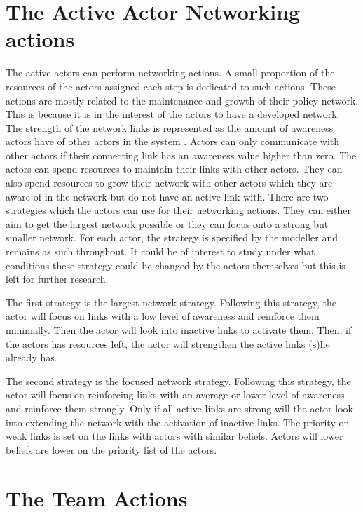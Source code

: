 %
\section{The Active Actor Networking actions}
\label{sec:actorNetworkingActions}

The active actors can perform networking actions. A small proportion of the resources of the actors assigned each step is dedicated to such actions. These actions are mostly related to the maintenance and growth of their policy network. This is because it is in the interest of the actors to have a developed network. The strength of the network links is represented as the amount of awareness actors have of other actors in the system \citep{heikkila2013building}. Actors can only communicate with other actors if their connecting link has an awareness value higher than zero. The actors can spend resources to maintain their links with other actors. They can also spend resources to grow their network with other actors which they are aware of in the network but do not have an active link with. There are two strategies which the actors can use for their networking actions. They can either aim to get the largest network possible or they can focus onto a strong but smaller network. For each actor, the strategy is specified by the modeller and remains as such throughout. It could be of interest to study under what conditions these strategy could be changed by the actors themselves but this is left for further research.

The first strategy is the largest network strategy. Following this strategy, the actor will focus on links with a low level of awareness and reinforce them minimally. Then the actor will look into inactive links to activate them. Then, if the actors has resources left, the actor will strengthen the active links (s)he already has.

The second strategy is the focused network strategy. Following this strategy, the actor will focus on reinforcing links with an average or lower level of awareness and reinforce them strongly. Only if all active links are strong will the actor look into extending the network with the activation of inactive links. The priority on weak links is set on the links with actors with similar beliefs. Actors will lower beliefs are lower on the priority list of the actors.


%
\section{The Team Actions}
\label{sec:teamActions}

